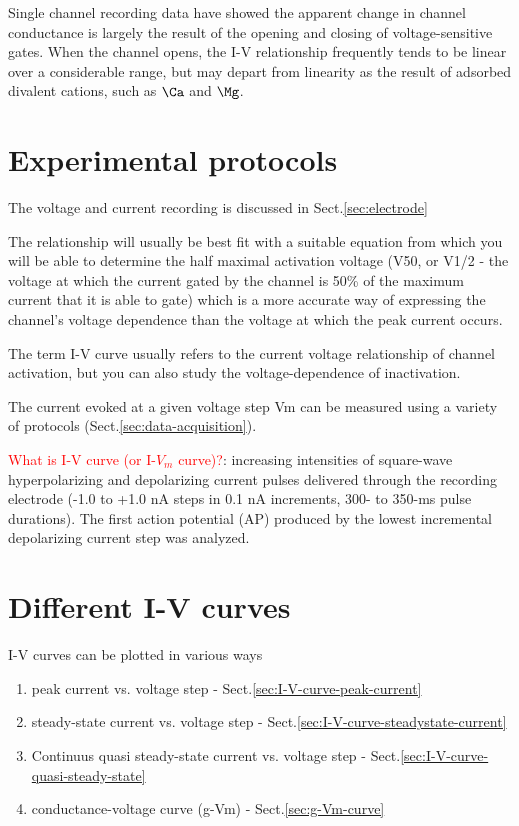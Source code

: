 Single channel recording data have showed the apparent change in channel
conductance is largely the result of the opening and closing of
voltage-sensitive gates. When the channel opens, the I-V relationship frequently
tends to be linear over a considerable range, but may depart from linearity as
the result of adsorbed divalent cations, such as $\Ca$ and $\Mg$.


\section{Experimental protocols}

The voltage and current recording is discussed in Sect.\ref{sec:electrode}

The relationship will usually be best fit with a suitable equation from which
you will be able to determine the half maximal activation voltage (V50, or V1/2
- the voltage at which the current gated by the channel is 50\% of the maximum
current that it is able to gate) which is a more accurate way of expressing the
channel's voltage dependence than the voltage at which the peak current occurs.


The term I-V curve usually refers to the current voltage relationship of channel
activation, but you can also study the voltage-dependence of inactivation.

The current evoked at a given voltage step Vm can be measured using a variety of
protocols (Sect.\ref{sec:data-acquisition}).

\textcolor{red}{What is I-V curve (or I-$V_m$ curve)?}:
increasing intensities of square-wave hyperpolarizing and depolarizing current
pulses delivered through the recording electrode (-1.0 to +1.0 nA steps in
0.1 nA increments, 300- to 350-ms pulse durations). The first action
potential (AP) produced by the lowest incremental depolarizing current
step was analyzed.

\section{Different I-V curves}
\label{sec:I-V-curve-rectification}

I-V curves can be plotted in various ways
\begin{enumerate}

  \item peak current vs. voltage step - Sect.\ref{sec:I-V-curve-peak-current}

  \item steady-state current vs. voltage step -
  Sect.\ref{sec:I-V-curve-steadystate-current}

  \item Continuus quasi steady-state current vs. voltage step -
  Sect.\ref{sec:I-V-curve-quasi-steady-state}

  \item conductance-voltage curve (g-Vm) - Sect.\ref{sec:g-Vm-curve}
\end{enumerate}


